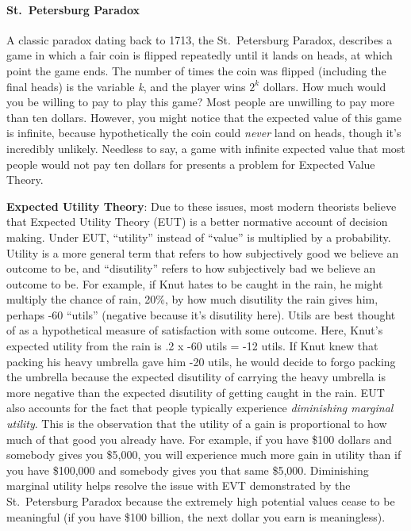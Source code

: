 \documentclass[
]{krantz}
\begin{document}
\hypertarget{st.-petersburg-paradox}{%
\paragraph{St.~Petersburg Paradox}\label{st.-petersburg-paradox}}

A classic paradox dating back to 1713, the St.~Petersburg Paradox, describes a game in which a fair coin is flipped repeatedly until it lands on heads, at which point the game ends. The number of times the coin was flipped (including the final heads) is the variable \emph{k}, and the player wins \(2^k\) dollars. How much would you be willing to pay to play this game? Most people are unwilling to pay more than ten dollars. However, you might notice that the expected value of this game is infinite, because hypothetically the coin could \emph{never} land on heads, though it's incredibly unlikely. Needless to say, a game with infinite expected value that most people would not pay ten dollars for presents a problem for Expected Value Theory.

\textbf{Expected Utility Theory}: Due to these issues, most modern theorists believe that Expected Utility Theory (EUT) is a better normative account of decision making. Under EUT, ``utility'' instead of ``value'' is multiplied by a probability. Utility is a more general term that refers to how subjectively good we believe an outcome to be, and ``disutility'' refers to how subjectively bad we believe an outcome to be. For example, if Knut hates to be caught in the rain, he might multiply the chance of rain, 20\%, by how much disutility the rain gives him, perhaps -60 ``utils'' (negative because it's disutility here). Utils are best thought of as a hypothetical measure of satisfaction with some outcome. Here, Knut's expected utility from the rain is .2 x -60 utils = -12 utils. If Knut knew that packing his heavy umbrella gave him -20 utils, he would decide to forgo packing the umbrella because the expected disutility of carrying the heavy umbrella is more negative than the expected disutility of getting caught in the rain. EUT also accounts for the fact that people typically experience \emph{diminishing marginal utility}. This is the observation that the utility of a gain is proportional to how much of that good you already have. For example, if you have \$100 dollars and somebody gives you \$5,000, you will experience much more gain in utility than if you have \$100,000 and somebody gives you that same \$5,000. Diminishing marginal utility helps resolve the issue with EVT demonstrated by the St.~Petersburg Paradox because the extremely high potential values cease to be meaningful (if you have \$100 billion, the next dollar you earn is meaningless).
\end{document}
